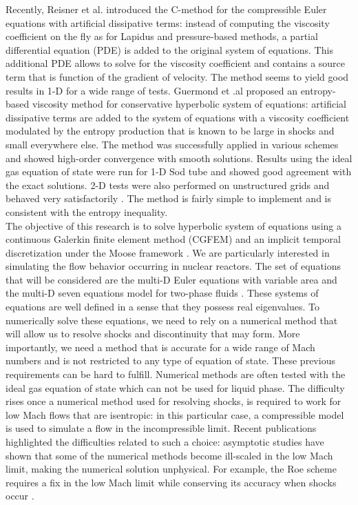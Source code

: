Recently, Reisner et al. \cite{Reisner} introduced the C-method for the compressible Euler equations with artificial dissipative terms: instead of computing the viscosity coefficient on the fly as for Lapidus and pressure-based methods, a partial differential equation (PDE) is added to the original system of equations. This additional PDE allows to solve for the viscosity coefficient and contains a source term that is function of the gradient of velocity. The method seems to yield good results in 1-D for a wide range of tests. 
Guermond et .al \cite{jlg1, jlg2, jlg3} proposed an entropy-based viscosity method for conservative hyperbolic system of equations: artificial dissipative terms are added to the system of equations with a viscosity coefficient modulated by the entropy production that is known to be large in shocks and small everywhere else. The method was successfully applied in various schemes \cite{jlg2, jlg3, valentin} and showed high-order convergence with smooth solutions. Results using the ideal gas equation of state were run for 1-D Sod tube and showed good agreement with the exact solutions. 2-D tests were also performed on unstructured grids and behaved very satisfactorily \cite{valentin}. The method is fairly simple to implement and is consistent with the entropy inequality.\\
The objective of this research is to solve hyperbolic system of equations using a continuous Galerkin finite element method (CGFEM) and an implicit temporal discretization under the Moose framework \cite{Moose}. We are particularly interested in simulating the flow behavior occurring in nuclear reactors. The set of equations that will be considered are the multi-D Euler equations with variable area \cite{Toro} and the multi-D seven equations model for two-phase fluids \cite{SEM}. These systems of equations are well defined in a sense that they possess real eigenvalues. To numerically solve these equations, we need to rely on a numerical method that will allow us to resolve shocks and discontinuity that may form. More importantly, we need a method that is accurate for a wide range of Mach numbers and is not restricted to any type of equation of state. These previous requirements can be hard to fulfill. Numerical methods are often tested with the ideal gas equation of state which can not be used for liquid phase. The difficulty rises once a numerical method used for resolving shocks, is required to work for low Mach flows that are isentropic: in this particular case, a compressible model is used to simulate a flow in the incompressible limit. Recent publications \cite{LowMach1, LowMach2} highlighted the difficulties related to such a choice: asymptotic studies have shown that some of the numerical methods become ill-scaled in the low Mach limit, making the numerical solution unphysical. For example, the Roe scheme requires a fix in the low Mach limit while conserving its accuracy when shocks occur \cite{Roe}. \\
